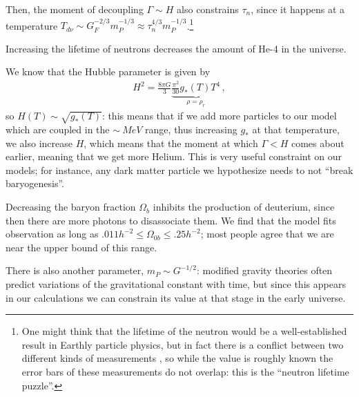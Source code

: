 \documentclass[main.tex]{subfiles}
\begin{document}
Then, the moment of decoupling \(\Gamma \sim H\) also constrains \(\tau _n\), since it happens at a temperature \(T_{d \nu } \sim G_F^{-2/3} m_P^{-1/3} \approx \tau_n^{4/3} m_P^{-1/3}\).\footnote{One might think that the lifetime of the neutron would be a well-established result in Earthly particle physics, but in fact there is a conflict between two different kinds of measurements \cite[]{wolchoverNeutronLifetimePuzzle}, so while the value is roughly known the error bars of these measurements do not overlap: this is the ``neutron lifetime puzzle''.}

Increasing the lifetime of neutrons decreases the amount of He-4 in the universe. 

We know that the Hubble parameter is given by
%
\begin{align}
  H^2 = \frac{8 \pi G}{3} \underbrace{\frac{\pi^2}{30} g_{*}(T) T^4}_{\rho = \rho _r}
\,,
\end{align}
%
so \(H(T) \sim \sqrt{g_* (T)}\): this means that if we add more particles to our model which are coupled in the \(\sim \SI{}{MeV}\) range, thus increasing \(g_*\) at that temperature, we also increase \(H\), which means that the moment at which \(\Gamma < H\) comes about earlier, meaning that we get more Helium. 
This is very useful constraint on our models; for instance, any dark matter particle we hypothesize needs to not ``break baryogenesis''.




Decreasing the baryon fraction \(\Omega_b\) inhibits the production of deuterium, since then there are more photons to disassociate them. 
We find that the model fits observation as long as \(\num{.011} h^{-2}\leq \Omega_{0b} \leq \num{.25} h^{-2}\); most people agree that we are near the upper bound of this range.

There is also another parameter, \(m_P \sim G^{-1/2}\): modified gravity theories often predict variations of the gravitational constant with time, but since this appears in our calculations we can constrain its value at that stage in the early universe.
\end{document}
